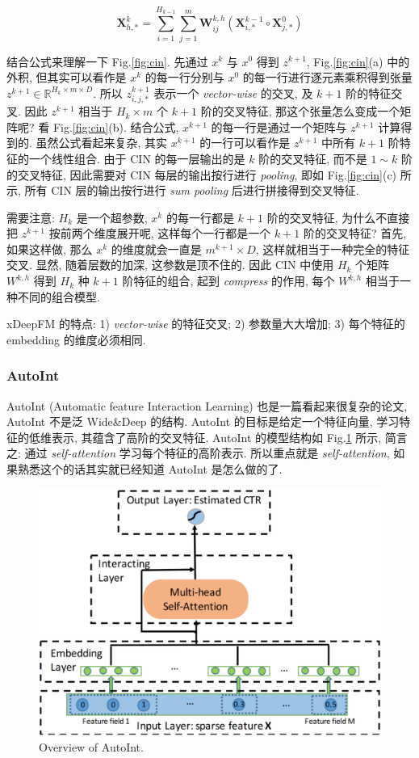 $$
\mathbf{X}_{h, *}^k=\sum_{i=1}^{H_{k-1}} \sum_{j=1}^m \mathbf{W}_{i j}^{k, h}\left(\mathbf{X}_{i, *}^{k-1} \circ \mathbf{X}_{j, *}^0\right)
$$

结合公式来理解一下 Fig.\ref{fig:cin}. 先通过 $x^k$ 与 $x^0$ 得到 $z^{k+1}$, Fig.\ref{fig:cin}(a) 中的外积, 但其实可以看作是 $x^k$ 的每一行分别与 $x^0$ 的每一行进行逐元素乘积得到张量 $z^{k+1} \in \mathbb{R}^{H_k \times m \times D}$. 所以 $z^{k+1}_{i,j,*}$ 表示一个 \textit{vector-wise} 的交叉, 及 $k+1$ 阶的特征交叉. 因此 $z^{k+1}$ 相当于 $H_k \times m$ 个 $k+1$ 阶的交叉特征, 那这个张量怎么变成一个矩阵呢? 看 Fig.\ref{fig:cin}(b). 结合公式, $x^{k+1}$ 的每一行是通过一个矩阵与 $z^{k+1}$ 计算得到的. 虽然公式看起来复杂, 其实 $x^{k+1}$ 的一行可以看作是 $z^{k+1}$ 中所有 $k+1$ 阶特征的一个线性组合. 由于 CIN 的每一层输出的是 $k$ 阶的交叉特征, 而不是 $1 \sim k$ 阶的交叉特征, 因此需要对 CIN 每层的输出按行进行 \textit{pooling}, 即如 Fig.\ref{fig:cin}(c) 所示, 所有 CIN 层的输出按行进行 \textit{sum pooling} 后进行拼接得到交叉特征. 

需要注意: $H_k$ 是一个超参数, $x^k$ 的每一行都是 $k+1$ 阶的交叉特征, 为什么不直接把 $z^{k+1}$ 按前两个维度展开呢, 这样每个一行都是一个 $k+1$ 阶的交叉特征? 首先, 如果这样做, 那么 $x^k$ 的维度就会一直是 $m^{k+1} \times D$, 这样就相当于一种完全的特征交叉. 显然, 随着层数的加深, 这参数是顶不住的. 因此 CIN 中使用 $H_k$ 个矩阵 $W^{k, h}$ 得到 $H_k$ 种 $k+1$ 阶特征的组合, 起到 \textit{compress} 的作用, 每个 $W^{k, h}$ 相当于一种不同的组合模型. 

xDeepFM 的特点: 1) \textit{vector-wise} 的特征交叉; 2) 参数量大大增加; 3) 每个特征的 embedding 的维度必须相同.

\subsubsection{AutoInt}
AutoInt (Automatic feature Interaction Learning)\cite{song_autoint_2019} 也是一篇看起来很复杂的论文, AutoInt 不是泛 Wide\&Deep 的结构. AutoInt 的目标是给定一个特征向量, 学习特征的低维表示, 其蕴含了高阶的交叉特征. AutoInt 的模型结构如 Fig.\ref{fig:autoint} 所示, 简言之: 通过 \textit{self-attention} 学习每个特征的高阶表示. 所以重点就是 \textit{self-attention}, 如果熟悉这个的话其实就已经知道 AutoInt 是怎么做的了. 

\begin{figure}[h]
	\centering
	\includegraphics[width=.65\textwidth]{pics/autoint.png}
	\caption{Overview of AutoInt.}
	\label{fig:autoint}
\end{figure} 

